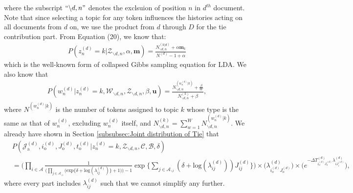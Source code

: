 \documentclass[a4paper]{article}
\begin{document}
   where the subscript $``{\backslash d, n}"$ denotes the exclsuion of position $n$ in $d^{th}$ document. Note that since selecting a topic for any token influences the histories acting on all documents from $d$ on, we use the product from $d$ through $D$ for the tie contribution part. From Equation (20), we know that:
   \begin{equation}
   \begin{aligned} 
   P(z^{(d)}_n=k|\mathcal{Z}_{\backslash d, n}, \alpha, \boldsymbol{m})=\frac{N^{(k|d)}_{\backslash d, n}+\alpha \boldsymbol{m}_k}{N^{(d)}-1+\alpha}
   \end{aligned}
   \end{equation}
   which is the well-known form of collapsed Gibbs sampling equation for LDA. We also know that \begin{equation}
   \begin{aligned} 
   P(w^{(d)}_n|z^{(d)}_n=k, \mathcal{W}_{\backslash d, n}, \mathcal{Z}_{\backslash d, n}, \beta, \boldsymbol{u} )=\frac{N^{(w_n^{(d)}|k)}_{\backslash d, n}+\frac{\beta}{W} }{N^{(k)}_{\backslash d, n}+\beta},
   \end{aligned}
   \end{equation}
   where $N^{(w_n^{(d)}|k)}$ is the number of tokens assigned to topic $k$ whose type is the same as that of $w_n^{(d)}$, excluding $w_n^{(d)}$ itself, and $N^{(k)}_{\backslash d, n}=\sum_{w=1}^W N_{\backslash d, n}^{(w_n^{(d)}|k)}$. We already have shown in Section \ref{subsubsec:Joint distribution of Tie} that
   \begin{equation}
   \begin{aligned}
   & P(\mathcal{J}^{(d)}_{\mbox{a}}, i^{(d)}_{\mbox{o}}, J^{(d)}_{\mbox{o}}, t^{(d)}_{\mbox{o}}| z^{(d)}_n=k, \mathcal{Z}_{\backslash d, n}, \mathcal{C}, \mathcal{B}, \delta)\\&=\Big( \prod_{i\in \mathcal{A}}\frac{1}{\Big(\prod_{j \in \mathcal{A}_{\backslash i}} \Big(\mbox{exp}\{\delta+\mbox{log}(\lambda_{ij}^{(d)})\} + 1\Big)\Big)-1}\exp\Big\{\sum_{j \in \mathcal{A}_{\backslash i}} (\delta+\mbox{log}(\lambda_{ij}^{(d)}))J_{ij}^{(d)} \Big\}\Big)\times \Big(\lambda^{(d)}_{i_o^{(d)}J_{o}^{(d)}}\Big)\times \Big(e^{-\Delta T^{(d)}_{i_o^{(d)}J_o^{(d)}}\lambda^{(d)}_{iJ^{(d)}_{i}}}\Big),
   \end{aligned}
   \end{equation}
   where every part includes $\lambda_{ij}^{(d)}$ such that we cannot simplify any further.
   
\end{document}
